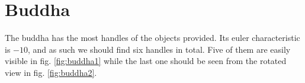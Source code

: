 \documentclass[a4paper,10pt,notitlepage]{scrreprt}
\begin{document}
\section{Buddha}

The buddha has the most handles of the objects provided. Its euler
characteristic is $-10$, and as such we should find six handles in total. Five
of them are easily visible in fig. \ref{fig:buddha1} while the last one should
be seen from the rotated view in fig. \ref{fig:buddha2}.

\begin{figure}
  \centering


\end{figure}
\end{document}
